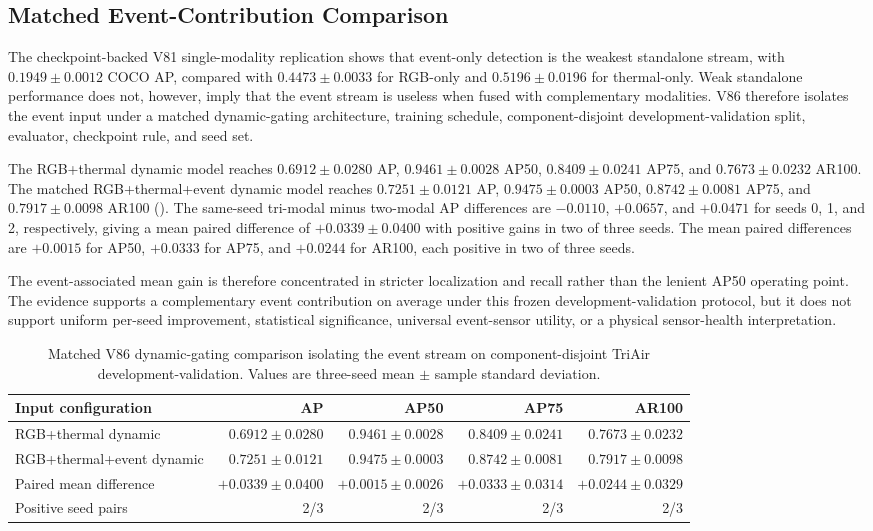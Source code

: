 \subsection{Matched Event-Contribution Comparison}
\label{sec:event-contribution}
The checkpoint-backed V81 single-modality replication shows that event-only detection is the weakest standalone stream, with $0.1949\pm0.0012$ COCO AP, compared with $0.4473\pm0.0033$ for RGB-only and $0.5196\pm0.0196$ for thermal-only. Weak standalone performance does not, however, imply that the event stream is useless when fused with complementary modalities. V86 therefore isolates the event input under a matched dynamic-gating architecture, training schedule, component-disjoint development-validation split, evaluator, checkpoint rule, and seed set.

The RGB+thermal dynamic model reaches $0.6912\pm0.0280$ AP, $0.9461\pm0.0028$ AP50, $0.8409\pm0.0241$ AP75, and $0.7673\pm0.0232$ AR100. The matched RGB+thermal+event dynamic model reaches $0.7251\pm0.0121$ AP, $0.9475\pm0.0003$ AP50, $0.8742\pm0.0081$ AP75, and $0.7917\pm0.0098$ AR100 (). The same-seed tri-modal minus two-modal AP differences are $-0.0110$, $+0.0657$, and $+0.0471$ for seeds 0, 1, and 2, respectively, giving a mean paired difference of $+0.0339\pm0.0400$ with positive gains in two of three seeds. The mean paired differences are $+0.0015$ for AP50, $+0.0333$ for AP75, and $+0.0244$ for AR100, each positive in two of three seeds.

The event-associated mean gain is therefore concentrated in stricter localization and recall rather than the lenient AP50 operating point. The evidence supports a complementary event contribution on average under this frozen development-validation protocol, but it does not support uniform per-seed improvement, statistical significance, universal event-sensor utility, or a physical sensor-health interpretation.

\begin{table}[t]
\centering
\caption{Matched V86 dynamic-gating comparison isolating the event stream on component-disjoint TriAir development-validation. Values are three-seed mean $\pm$ sample standard deviation.}
\label{tab:event-contribution-v86}
\small
\begin{tabular}{@{}lrrrr@{}}
\toprule
Input configuration & AP & AP50 & AP75 & AR100\\
\midrule
RGB+thermal dynamic & $0.6912\pm0.0280$ & $0.9461\pm0.0028$ & $0.8409\pm0.0241$ & $0.7673\pm0.0232$\\
RGB+thermal+event dynamic & $\mathbf{0.7251\pm0.0121}$ & $\mathbf{0.9475\pm0.0003}$ & $\mathbf{0.8742\pm0.0081}$ & $\mathbf{0.7917\pm0.0098}$\\
\midrule
Paired mean difference & $+0.0339\pm0.0400$ & $+0.0015\pm0.0026$ & $+0.0333\pm0.0314$ & $+0.0244\pm0.0329$\\
Positive seed pairs & 2/3 & 2/3 & 2/3 & 2/3\\
\bottomrule
\end{tabular}
\end{table}

